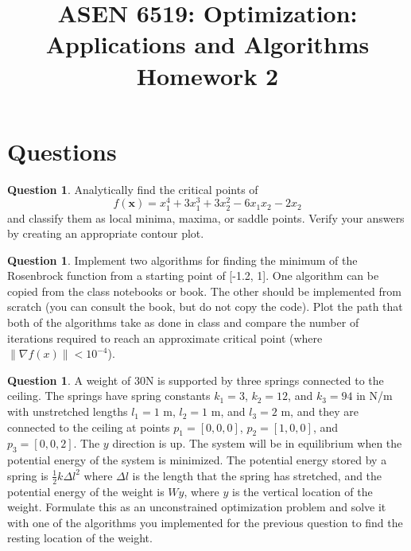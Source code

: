 \documentclass{article}
\title{ASEN 6519: Optimization: Applications and Algorithms\\
       Homework 2}
\theoremstyle{definition}
\newtheorem{question}[thm]{Question}
\begin{document}
\maketitle

\section{Questions}

\begin{question}
    Analytically find the critical points of
    $$f(\mathbf{x}) = x_1^4 + 3 x_1^3 + 3 x_2^2 - 6 x_1 x_2 - 2 x_2$$
    and classify them as local minima, maxima, or saddle points.
    Verify your answers by creating an appropriate contour plot.
\end{question}

\begin{question}
    Implement two algorithms for finding the minimum of the Rosenbrock function from a starting point of [-1.2, 1]. One algorithm can be copied from the class notebooks or book. The other should be implemented from scratch (you can consult the book, but do not copy the code). Plot the path that both of the algorithms take as done in class and compare the number of iterations required to reach an approximate critical point (where $\lVert \nabla f(x) \rVert < 10^{-4}$).
\end{question}

\begin{question}
    A weight of 30N is supported by three springs connected to the ceiling. The springs have spring constants $k_1 = 3$, $k_2 = 12$, and $k_3 = 94$ in N/m with unstretched lengths $l_1 = 1$ m, $l_2 = 1$ m, and $l_3 = 2$ m, and they are connected to the ceiling at points $p_1 = [0, 0, 0]$, $p_2 = [1, 0, 0]$, and $p_3 = [0, 0, 2]$.  The $y$ direction is up. The system will be in equilibrium when the potential energy of the system is minimized. The potential energy stored by a spring is $\frac{1}{2} k \Delta l^2$ where $\Delta l$ is the length that the spring has stretched, and the potential energy of the weight is $Wy$, where $y$ is the vertical location of the weight. Formulate this as an unconstrained optimization problem and solve it with one of the algorithms you implemented for the previous question to find the resting location of the weight.
\end{question}
\end{document}

